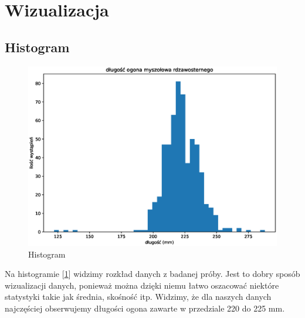 \documentclass{article}
\theoremstyle{break}
\begin{document}
	\section{Wizualizacja}
	\subsection{Histogram}
	\begin{figure}[H]
	\begin{center}
		\includegraphics[scale=0.75]{HISTOGRAM.eps}
		\caption{Histogram}
		\label{fig:hist}
	\end{center}
	\end{figure}
Na histogramie [\ref{fig:hist}] widzimy rozkład danych z badanej próby. Jest to dobry sposób wizualizacji danych, ponieważ można dzięki niemu łatwo oszacować niektóre statystyki takie jak średnia, skośność itp. Widzimy, że dla naszych danych najczęściej obserwujemy długości ogona zawarte w przedziale 220 do 225 mm.
\end{document}
